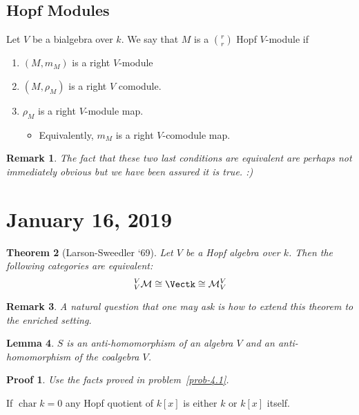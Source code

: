 \documentclass[12pt]{article}
\theoremstyle{break}
\theoremstyle{nonumberbreak}
\theoremstyle{changebreak}
\newtheorem{thm}{Theorem}[subsection]
\newtheorem{lem}[thm]{Lemma}
\theoremstyle{break}
\theoremstyle{nonumberbreak}
\newtheorem{prf}{Proof}
\theoremstyle{nonumberplain}
\theoremstyle{change}
\newtheorem{rmk}[thm]{Remark}
\DeclareMathOperator{\ch}{char}
\begin{document}
\subsection{Hopf Modules}\label{subsec-hopfmod}
\begin{defn}
	Let $V$ be a bialgebra over $k$. We say that $M$ is a $\binom{r}{r}$ Hopf $V$-module if
	\begin{enumerate}
		\item $(M,m_M)$ is a right $V$-module
		\item $(M,\rho_M)$ is a right $V$ comodule.
		\item $\rho_M$ is a right $V$-module map.
		\begin{itemize}
			\item Equivalently, $m_M$ is a right $V$-comodule map.
		\end{itemize}
	\end{enumerate}
\end{defn}
\begin{rmk}
	The fact that these two last conditions are equivalent are perhaps not immediately obvious but we
	have been assured it is true. :)
\end{rmk}

\section{January 16, 2019}
\begin{thm}[Larson-Sweedler `69]\label{thm-LS69}
	Let $V$ be a Hopf algebra over $k$. Then the following categories are equivalent:
	\[_V^V\mathcal{M}\cong \Vectk\cong \mathcal{M}_V^V\]
\end{thm}

\begin{rmk}
	A natural question that one may ask is how to extend this theorem to the enriched setting.
\end{rmk}

\begin{lem}
	$S$ is an anti-homomorphism of an algebra $V$ and an anti-homomorphism of the coalgebra $V$.
\end{lem}
\begin{prf}
	Use the facts proved in problem~\ref{prob-4.1}.
\end{prf}

\begin{prob}
	If $\ch k=0$ any Hopf quotient of $k[x]$ is either $k$ or $k[x]$ itself.
\end{prob}
\end{document}
